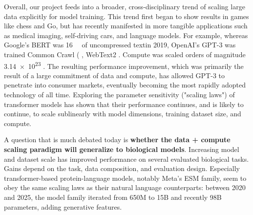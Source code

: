 Overall, our project feeds into a broader, cross-disciplinary trend of scaling large data explicitly for model training. This trend first began to show results in games like chess and Go, but has recently manifested in more tangible applications such as medical imaging, self-driving cars, and language models. For example, whereas Google's BERT was \mbox{\SI{16}{\giga\byte}} of uncompressed text\inserted{, }in 2019, OpenAI's GPT-3 was trained   Common Crawl ( , WebText2  . Compute was scaled orders of magnitude   \mbox{\SI{3.14e23}{\flops}} . The resulting performance improvement, which was primarily the result of a large commitment of data and compute, has allowed GPT-3 to penetrate into consumer markets, eventually becoming the most rapidly adopted technology of all time. Exploring the parameter sensitivity ("scaling laws") of transformer models has shown that their performance continues, and is likely to continue, to scale sublinearly with model dimensions, training dataset size, and compute.

 A question that is much debated today is \textbf{whether the data + compute scaling paradigm will generalize to biological models}. Increasing model and dataset scale has improved performance on several evaluated biological tasks. Gains depend on the task, data composition, and evaluation design. Especially transformer-based protein-language models, notably Meta's ESM family, seem to obey the same scaling laws as their natural language counterparts: between 2020 and 2025, the model family iterated from 650M to 15B and recently 98B parameters, adding generative features.


